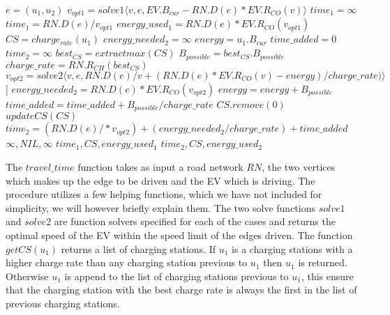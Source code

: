 \begin{algorithm}[!htb]
 \begin{algorithmic}[1]
  	\State $e = (u_1, u_2)$
  	\State $v_{opt1} = solve1\langle v, e, EV.B_{cur}-RN.D(e)*EV.R_{CO}(v)\rangle$
  		\State $time_1 = \infty$
  	\Else
 		\State $time_1 = RN.D(e) / v_{opt1}$
 		\State $energy\_used_{1} = RN.D(e)*EV.R_{CO}(v_{opt1})$
  	\EndIf
		\State $CS = charge_{rate}(u_1)$ 
  		\State $energy\_needed_{2} = \infty$
  		\State $energy = u_1.B_{cur}$
  		\State $time\_added = 0$
  		\State $time_2 = \infty$
  		\State $best_{CS} = extractmax(CS)$
  		\State $B_{possible} = best_{CS}.B_{possible}$
  		\State $charge\_rate = RN.R_{CH}(best_{CS})$
  		\State $v_{opt2} = solve2 \langle v, e,  RN.D(e)/v + (RN.D(e) * EV.R_{CO}(v)-energy)/charge\_rate) \rangle$] 
  		\State $energy\_needed_{2} = RN.D(e)*EV.R_{CO}(v_{opt2})$
  		\State $energy = energy + B_{possible}$
  			\State $time\_added = time\_added + B_{possible}/charge\_rate$
  			\State $CS.remove(0)$
  			\State $updateCS(CS)$
  		\EndIf	
  	\EndWhile
  		\State $time_2 = (RN.D(e)/*v_{opt2}) + (energy\_needed_{2}/charge\_rate) + time\_added$
  	\EndIf
  		\State \Return $\infty, NIL, \infty$
  	\EndIf
  		\State \Return $time_1, CS, energy\_used_1$
  	\Else
  		\State \Return $time_2, CS, energy\_used_2$
  	\EndIf
  \EndFunction
  \end{algorithmic}\label{alg:fastest_path}
\end{algorithm}

The $travel\_time$ function takes as input a road network $RN$, the two vertices which makes up the edge to be driven and the EV which is driving. The procedure utilizes a few helping functions, which we have not included for simplicity, we will however briefly explain them. The two solve functions $solve1$ and $solve2$ are function solvers specified for each of the cases and returns the optimal speed of the EV within the speed limit of the edges driven. The function $getCS(u_1)$ returns a list of charging stations. If $u_1$ is a charging stations with a higher charge rate than any charging station previous to $u_1$ then $u_1$ is returned. Otherwise $u_1$ is append to the list of charging stations previous to $u_1$, this ensure that the charging station with the best charge rate is always the first in the list of previous charging stations. 

